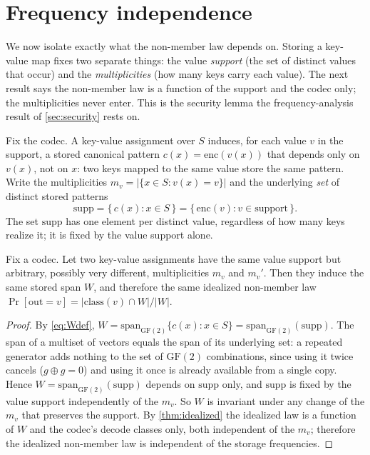 \documentclass[sigconf,nonacm,anonymous,balance=false]{acmart}
\newcommand{\enc}{\mathrm{enc}}
\newcommand{\GF}{\mathrm{GF}(2)}
\newcommand{\spn}{\mathrm{span}}
\newcommand{\class}{\mathrm{class}}
\newcommand{\W}{W}                          %
\newcommand{\supp}{\mathrm{supp}}           %
\newcommand{\cx}{c(x)}                      %
\newcommand{\inter}{\cap}
\begin{document}
\section{Frequency independence}
\label{sec:t3}

We now isolate exactly what the non-member law depends on. Storing a key-value map
fixes two separate things: the value \emph{support} (the set of distinct values that
occur) and the \emph{multiplicities} (how many keys carry each value). The next result
says the non-member law is a function of the support and the codec only; the
multiplicities never enter. This is the security lemma the frequency-analysis result
of \cref{sec:security} rests on.

Fix the codec. A key-value assignment over $S$ induces, for each value $v$ in the
support, a stored canonical pattern $\cx = \enc(v(x))$ that depends only on $v(x)$,
not on $x$: two keys mapped to the same value store the same pattern. Write the
multiplicities $m_v = |\{x \in S : v(x) = v\}|$ and the underlying \emph{set} of
distinct stored patterns
\[
  \supp = \{\, \cx : x \in S \,\} = \{\, \enc(v) : v \in \text{support} \,\}.
\]
The set $\supp$ has one element per distinct value, regardless of how many keys
realize it; it is fixed by the value support alone.

\begin{theorem}
\label{thm:freqindep}
Fix a codec. Let two key-value assignments have the same value support but arbitrary,
possibly very different, multiplicities $m_v$ and $m_v'$. Then they induce the same
stored span $\W$, and therefore the same idealized non-member law
$\Pr[\mathrm{out} = v] = |\class(v) \inter \W| / |\W|$.
\end{theorem}

\begin{proof}
By \eqref{eq:Wdef}, $\W = \spn_{\GF}\{\cx : x \in S\} = \spn_{\GF}(\supp)$. The span of
a multiset of vectors equals the span of its underlying set: a repeated generator adds
nothing to the set of $\GF$ combinations, since using it twice cancels
($g \oplus g = 0$) and using it once is already available from a single copy. Hence
$\W = \spn_{\GF}(\supp)$ depends on $\supp$ only, and $\supp$ is fixed by the value
support independently of the $m_v$. So $\W$ is invariant under any change of the $m_v$
that preserves the support. By \cref{thm:idealized} the idealized law is a function of
$\W$ and the codec's decode classes only, both independent of the $m_v$; therefore the
idealized non-member law is independent of the storage frequencies.
\end{proof}
\end{document}
